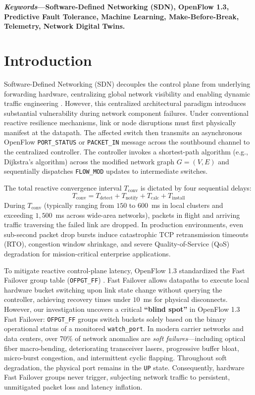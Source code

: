 \documentclass[10pt,twocolumn]{article}
\begin{document}
\textbf{\textit{Keywords}---Software-Defined Networking (SDN), OpenFlow 1.3, Predictive Fault Tolerance, Machine Learning, Make-Before-Break, Telemetry, Network Digital Twins.}

\section{Introduction}
Software-Defined Networking (SDN) decouples the control plane from underlying forwarding hardware, centralizing global network visibility and enabling dynamic traffic engineering \cite{mckeown2008openflow}. However, this centralized architectural paradigm introduces substantial vulnerability during network component failures. Under conventional reactive resilience mechanisms, link or node disruptions must first physically manifest at the datapath. The affected switch then transmits an asynchronous OpenFlow \texttt{PORT\_STATUS} or \texttt{PACKET\_IN} message across the southbound channel to the centralized controller. The controller invokes a shortest-path algorithm (e.g., Dijkstra's algorithm) across the modified network graph $G=(V, E)$ and sequentially dispatches \texttt{FLOW\_MOD} updates to intermediate switches.

The total reactive convergence interval $T_{\text{conv}}$ is dictated by four sequential delays:
\begin{equation}
T_{\text{conv}} = T_{\text{detect}} + T_{\text{notify}} + T_{\text{calc}} + T_{\text{install}}
\label{eq:t_conv}
\end{equation}
During $T_{\text{conv}}$ (typically ranging from $150$ to $600$~ms in local clusters and exceeding $1{,}500$~ms across wide-area networks), packets in flight and arriving traffic traversing the failed link are dropped. In production environments, even sub-second packet drop bursts induce catastrophic TCP retransmission timeouts (RTO), congestion window shrinkage, and severe Quality-of-Service (QoS) degradation for mission-critical enterprise applications.

To mitigate reactive control-plane latency, OpenFlow 1.3 standardized the Fast Failover group table (\texttt{OFPGT\_FF}) \cite{openflow13spec}. Fast Failover allows datapaths to execute local hardware bucket switching upon link state change without querying the controller, achieving recovery times under $10$~ms for physical disconnects. However, our investigation uncovers a critical \textbf{``blind spot''} in OpenFlow 1.3 Fast Failover: \texttt{OFPGT\_FF} groups switch buckets solely based on the binary operational status of a monitored \texttt{watch\_port}. In modern carrier networks and data centers, over 70\% of network anomalies are \textit{soft failures}---including optical fiber macro-bending, deteriorating transceiver lasers, progressive buffer bloat, micro-burst congestion, and intermittent cyclic flapping. Throughout soft degradation, the physical port remains in the \texttt{UP} state. Consequently, hardware Fast Failover groups never trigger, subjecting network traffic to persistent, unmitigated packet loss and latency inflation.
\end{document}

